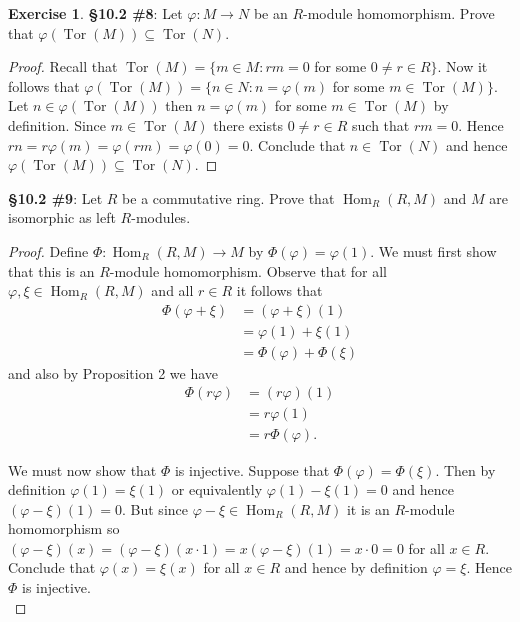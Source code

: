 \documentclass[8pt]{amsart}
\theoremstyle{plain}%
\theoremstyle{definition}
\newtheorem*{exercise}{Exercise}%
\theoremstyle{remark}
\numberwithin{equation}{section}
\begin{document}
\begin{exercise}
\textbf{\S 10.2 \#8}: Let $\varphi : M \to N$ be an $R$-module homomorphism. Prove that $\varphi(\operatorname{Tor}(M)) \subseteq \operatorname{Tor}(N)$.
	\begin{proof}
		Recall that $\operatorname{Tor}(M) = \{m \in M : rm = 0$ for some $0 \neq r \in R\}$. Now it follows that $\varphi(\operatorname{Tor}(M)) = \{n \in N : n = \varphi(m)$ for some $m \in \operatorname{Tor}(M)\}$. Let $n \in \varphi(\operatorname{Tor}(M))$ then $n = \varphi(m)$ for some $m \in \operatorname{Tor}(M)$ by definition. Since $m \in \operatorname{Tor}(M)$ there exists $0 \neq r \in R$ such that $rm = 0$. Hence $rn = r \varphi(m) = \varphi(rm) = \varphi(0) = 0$. Conclude that $n \in \operatorname{Tor}(N)$ and hence $\varphi(\operatorname{Tor}(M)) \subseteq \operatorname{Tor}(N)$.
	\end{proof}


\textbf{\S 10.2 \#9}: Let $R$ be a commutative ring. Prove that $\operatorname{Hom}_R(R, M)$ and $M$ are isomorphic as left $R$-modules.
	\begin{proof}
		Define $\Phi : \operatorname{Hom}_R(R, M) \to M$ by $\Phi(\varphi) = \varphi(1)$. We must first show that this is an $R$-module homomorphism. Observe that for all $\varphi, \xi \in \operatorname{Hom}_R(R, M)$ and all $r \in R$ it follows that
		\begin{align*}
			\Phi(\varphi + \xi) &= (\varphi + \xi)(1)\\
			&= \varphi(1) + \xi(1)\\
			&= \Phi(\varphi) + \Phi(\xi) 
		\end{align*}
		and also by Proposition 2 we have
		\begin{align*}
			\Phi(r\varphi) &= (r\varphi)(1)\\
			&= r \varphi(1)\\
			&= r \Phi(\varphi).
		\end{align*}
		
		We must now show that $\Phi$ is injective. Suppose that $\Phi(\varphi) = \Phi(\xi)$. Then by definition $\varphi(1) = \xi(1)$ or equivalently $\varphi(1) - \xi(1) = 0$ and hence $(\varphi - \xi)(1) = 0$. But since $\varphi - \xi \in \operatorname{Hom}_R(R, M)$ it is an $R$-module homomorphism so $(\varphi - \xi)(x) = (\varphi - \xi)(x \cdot 1) = x(\varphi - \xi)(1) = x \cdot 0 = 0$ for all $x \in R$. Conclude that $\varphi(x) = \xi(x)$ for all $x \in R$ and hence by definition $\varphi = \xi$. Hence $\Phi$ is injective.\\


\end{proof}
\end{exercise}
\end{document}
